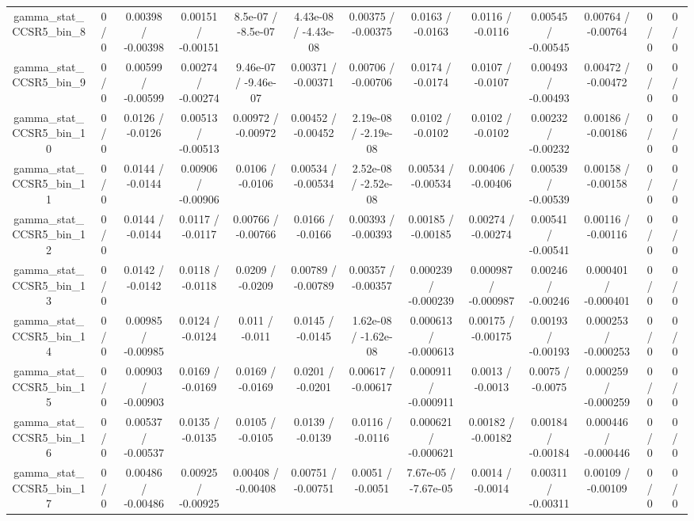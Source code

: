 \documentclass[10pt]{article}
\begin{document}
\begin{table}[htbp]
\begin{center}
\begin{tabular}{|c|c|c|c|c|c|c|c|c|c|c|c|c|}
  gamma_stat_CCSR5_bin_8 & 0 / 0 & 0.00398 / -0.00398 & 0.00151 / -0.00151 & 8.5e-07 / -8.5e-07 & 4.43e-08 / -4.43e-08 & 0.00375 / -0.00375 & 0.0163 / -0.0163 & 0.0116 / -0.0116 & 0.00545 / -0.00545 & 0.00764 / -0.00764 & 0 / 0 & 0 / 0 \\ 
  gamma_stat_CCSR5_bin_9 & 0 / 0 & 0.00599 / -0.00599 & 0.00274 / -0.00274 & 9.46e-07 / -9.46e-07 & 0.00371 / -0.00371 & 0.00706 / -0.00706 & 0.0174 / -0.0174 & 0.0107 / -0.0107 & 0.00493 / -0.00493 & 0.00472 / -0.00472 & 0 / 0 & 0 / 0 \\ 
  gamma_stat_CCSR5_bin_10 & 0 / 0 & 0.0126 / -0.0126 & 0.00513 / -0.00513 & 0.00972 / -0.00972 & 0.00452 / -0.00452 & 2.19e-08 / -2.19e-08 & 0.0102 / -0.0102 & 0.0102 / -0.0102 & 0.00232 / -0.00232 & 0.00186 / -0.00186 & 0 / 0 & 0 / 0 \\ 
  gamma_stat_CCSR5_bin_11 & 0 / 0 & 0.0144 / -0.0144 & 0.00906 / -0.00906 & 0.0106 / -0.0106 & 0.00534 / -0.00534 & 2.52e-08 / -2.52e-08 & 0.00534 / -0.00534 & 0.00406 / -0.00406 & 0.00539 / -0.00539 & 0.00158 / -0.00158 & 0 / 0 & 0 / 0 \\ 
  gamma_stat_CCSR5_bin_12 & 0 / 0 & 0.0144 / -0.0144 & 0.0117 / -0.0117 & 0.00766 / -0.00766 & 0.0166 / -0.0166 & 0.00393 / -0.00393 & 0.00185 / -0.00185 & 0.00274 / -0.00274 & 0.00541 / -0.00541 & 0.00116 / -0.00116 & 0 / 0 & 0 / 0 \\ 
  gamma_stat_CCSR5_bin_13 & 0 / 0 & 0.0142 / -0.0142 & 0.0118 / -0.0118 & 0.0209 / -0.0209 & 0.00789 / -0.00789 & 0.00357 / -0.00357 & 0.000239 / -0.000239 & 0.000987 / -0.000987 & 0.00246 / -0.00246 & 0.000401 / -0.000401 & 0 / 0 & 0 / 0 \\ 
  gamma_stat_CCSR5_bin_14 & 0 / 0 & 0.00985 / -0.00985 & 0.0124 / -0.0124 & 0.011 / -0.011 & 0.0145 / -0.0145 & 1.62e-08 / -1.62e-08 & 0.000613 / -0.000613 & 0.00175 / -0.00175 & 0.00193 / -0.00193 & 0.000253 / -0.000253 & 0 / 0 & 0 / 0 \\ 
  gamma_stat_CCSR5_bin_15 & 0 / 0 & 0.00903 / -0.00903 & 0.0169 / -0.0169 & 0.0169 / -0.0169 & 0.0201 / -0.0201 & 0.00617 / -0.00617 & 0.000911 / -0.000911 & 0.0013 / -0.0013 & 0.0075 / -0.0075 & 0.000259 / -0.000259 & 0 / 0 & 0 / 0 \\ 
  gamma_stat_CCSR5_bin_16 & 0 / 0 & 0.00537 / -0.00537 & 0.0135 / -0.0135 & 0.0105 / -0.0105 & 0.0139 / -0.0139 & 0.0116 / -0.0116 & 0.000621 / -0.000621 & 0.00182 / -0.00182 & 0.00184 / -0.00184 & 0.000446 / -0.000446 & 0 / 0 & 0 / 0 \\ 
  gamma_stat_CCSR5_bin_17 & 0 / 0 & 0.00486 / -0.00486 & 0.00925 / -0.00925 & 0.00408 / -0.00408 & 0.00751 / -0.00751 & 0.0051 / -0.0051 & 7.67e-05 / -7.67e-05 & 0.0014 / -0.0014 & 0.00311 / -0.00311 & 0.00109 / -0.00109 & 0 / 0 & 0 / 0 \\ 

\end{tabular}
\end{center}
\end{table}
\end{document}
